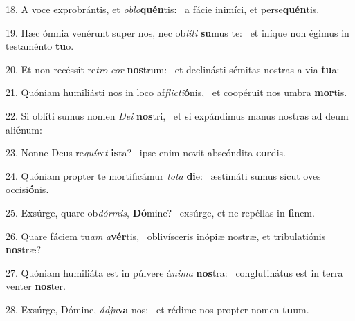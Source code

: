 18. A voce exprobrántis, et \textit{ob}\textit{lo}\textbf{quén}tis: \ast\  a fácie inimíci, et perse\textbf{quén}tis.\

19. Hæc ómnia venérunt super nos, nec ob\textit{lí}\textit{ti} \textbf{su}mus te: \ast\  et iníque non égimus in testaménto \textbf{tu}o.\

20. Et non recéssit re\textit{tro} \textit{cor} \textbf{nos}trum: \ast\  et declinásti sémitas nostras a via \textbf{tu}a:\

21. Quóniam humiliásti nos in loco af\textit{flic}\textit{ti}\textbf{ó}nis, \ast\  et coopéruit nos umbra \textbf{mor}tis.\

22. Si oblíti sumus nomen \textit{De}\textit{i} \textbf{nos}tri, \ast\  et si expándimus manus nostras ad deum ali\textbf{é}num:\

23. Nonne Deus re\textit{quí}\textit{ret} \textbf{is}ta? \ast\  ipse enim novit abscóndita \textbf{cor}dis.\

24. Quóniam propter te mortificámur \textit{to}\textit{ta} \textbf{di}e: \ast\  æstimáti sumus sicut oves occisi\textbf{ó}nis.\

25. Exsúrge, quare ob\textit{dór}\textit{mis}, \textbf{Dó}mine? \ast\  exsúrge, et ne repéllas in \textbf{fi}nem.\

26. Quare fáciem tu\textit{am} \textit{a}\textbf{vér}tis, \ast\  oblivísceris inópiæ nostræ, et tribulatiónis \textbf{nos}træ?\

27. Quóniam humiliáta est in púlvere á\textit{ni}\textit{ma} \textbf{nos}tra: \ast\  conglutinátus est in terra venter \textbf{nos}ter.\

28. Exsúrge, Dómine, \textit{ád}\textit{ju}\textbf{va} nos: \ast\  et rédime nos propter nomen \textbf{tu}um.\

